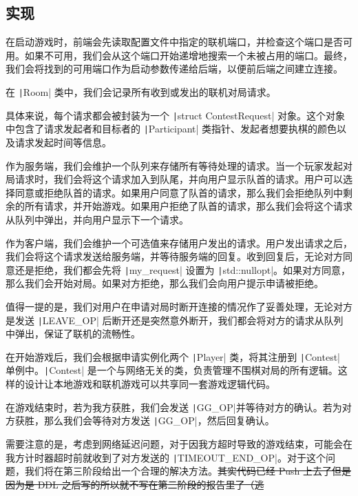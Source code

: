 \documentclass[UTF8]{ctexart}
\begin{document}
\subsection{实现} 在启动游戏时，前端会先读取配置文件中指定的联机端口，并检查这个端口是否可用。如果不可用，我们会从这个端口开始递增地搜索一个未被占用的端口。最终，我们会将找到的可用端口作为启动参数传递给后端，以便前后端之间建立连接。\par 在 \texttt|Room| 类中，我们会记录所有收到或发出的联机对局请求。\par 具体来说，每个请求都会被封装为一个 \texttt|struct ContestRequest| 对象。这个对象中包含了请求发起者和目标者的 \texttt|Participant| 类指针、发起者想要执棋的颜色以及请求发起时间等信息。\par 作为服务端，我们会维护一个队列来存储所有等待处理的请求。当一个玩家发起对局请求时，我们会将这个请求加入到队尾，并向用户显示队首的请求。用户可以选择同意或拒绝队首的请求。如果用户同意了队首的请求，那么我们会拒绝队列中剩余的所有请求，并开始游戏。如果用户拒绝了队首的请求，那么我们会将这个请求从队列中弹出，并向用户显示下一个请求。\par 作为客户端，我们会维护一个可选值来存储用户发出的请求。用户发出请求之后，我们会将这个请求发送给服务端，并等待服务端的回复。收到回复后，无论对方同意还是拒绝，我们都会先将 \texttt|my_request| 设置为 \texttt|std::nullopt|。如果对方同意，那么我们会开始对局。如果对方拒绝，那么我们会向用户提示申请被拒绝。\par
值得一提的是，我们对用户在申请对局时断开连接的情况作了妥善处理，无论对方是发送 \texttt|LEAVE_OP| 后断开还是突然意外断开，我们都会将对方的请求从队列中弹出，保证了联机的流畅性。\par
在开始游戏后，我们会根据申请实例化两个 \texttt|Player| 类，将其注册到 \texttt|Contest| 单例中。\texttt|Contest| 是一个与网络无关的类，负责管理不围棋对局的所有逻辑。这样的设计让本地游戏和联机游戏可以共享同一套游戏逻辑代码。\par
在游戏结束时，若为我方获胜，我们会发送 \texttt|GG_OP|并等待对方的确认。若为对方获胜，那么我们会等待对方发送 \texttt|GG_OP|，然后回复确认。\par
需要注意的是，考虑到网络延迟问题，对于因我方超时导致的游戏结束，可能会在我方计时器超时前就收到了对方发送的 \texttt|TIMEOUT_END_OP|。对于这个问题，我们将在第三阶段给出一个合理的解决方法。\sout{其实代码已经 Push 上去了但是因为是 DDL 之后写的所以就不写在第二阶段的报告里了（逃}
\end{document}
